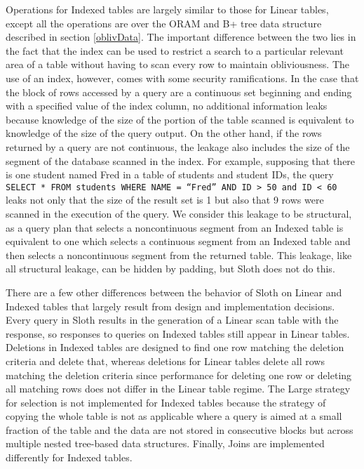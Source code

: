 \documentclass[USenglish,oneside,twocolumn]{article}
\def\name/{Sloth}
\begin{document}
Operations for Indexed tables are largely similar to those for Linear tables, except all the operations are over the ORAM and B+ tree data structure described in section \ref{oblivData}. The important difference between the two lies in the fact that the index can be used to restrict a search to a particular relevant area of a table without having to scan every row to maintain obliviousness. The use of an index, however, comes with some security ramifications. In the case that the block of rows accessed by a query are a continuous set beginning and ending with a specified value of the index column, no additional information leaks because knowledge of the size of the portion of the table scanned is equivalent to knowledge of the size of the query output. On the other hand, if the rows returned by a query are not continuous, the leakage also includes the size of the segment of the database scanned in the index. For example, supposing that there is one student named Fred in a table of students and student IDs,  the query \texttt{SELECT * FROM students WHERE NAME = ``Fred'' AND ID > 50 and ID < 60} leaks not only that the size of the result set is 1 but also that 9 rows were scanned in the execution of the query. We consider this leakage to be structural, as a query plan that selects a noncontinuous segment from an Indexed table is equivalent to one which selects a continuous segment from an Indexed table and then selects a noncontinuous segment from the returned table. This leakage, like all structural leakage, can be hidden by padding, but \name/ does not do this. 

There are a few other differences between the behavior of \name/ on Linear and Indexed tables that largely result from design and implementation decisions. Every query in \name/ results in the generation of a Linear scan table with the response, so responses to queries on Indexed tables still appear in Linear tables. Deletions in Indexed tables are designed to find one row matching the deletion criteria and delete that, whereas deletions for Linear tables delete all rows matching the deletion criteria since performance for deleting one row or deleting all matching rows does not differ in the Linear table regime. The Large strategy for selection is not implemented for Indexed tables because the strategy of copying the whole table is not as applicable where a query is aimed at a small fraction of the table and the data are not stored in consecutive blocks but across multiple nested tree-based data structures. Finally, Joins are implemented differently for Indexed tables. 
\end{document}
